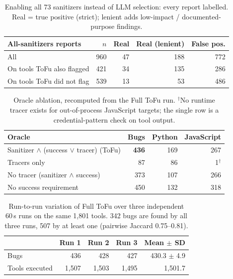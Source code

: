 \begin{table}[t]
\centering
\caption{Enabling all 73 sanitizers instead of LLM selection: every report labelled.
Real = true positive (strict); lenient adds low-impact / documented-purpose findings.}
\label{tab:ablation-allsan}
\small
\begin{tabular}{lrrrr}
\toprule
All-sanitizers reports & $n$ & Real & Real (lenient) & False pos. \\
\midrule
All                            & 960 & 47 & 188 & 772 \\
On tools ToFu also flagged     & 421 & 34 & 135 & 286 \\
On tools ToFu did not flag     & 539 & 13 &  53 & 486 \\
\bottomrule
\end{tabular}
\end{table}

\begin{table}[t]
\centering
\caption{Oracle ablation, recomputed from the Full ToFu run. $^\dagger$No runtime tracer exists for
out-of-process JavaScript targets; the single row is a credential-pattern check on tool output.}
\label{tab:ablation-oracle}
\small
\begin{tabular}{lrrr}
\toprule
Oracle & Bugs & Python & JavaScript \\
\midrule
Sanitizer $\wedge$ (success $\vee$ tracer) (ToFu) & \textbf{436} & 169 & 267 \\
Tracers only                                       &  87 &  86 & 1$^\dagger$ \\
No tracer (sanitizer $\wedge$ success)             & 373 & 107 & 266 \\
No success requirement                             & 450 & 132 & 318 \\
\bottomrule
\end{tabular}
\end{table}

\begin{table}[t]
\centering
\caption{Run-to-run variation of Full ToFu over three independent 60\,s runs on the same 1,801 tools.
342 bugs are found by all three runs, 507 by at least one (pairwise Jaccard 0.75--0.81).}
\label{tab:ablation-repeats}
\small
\begin{tabular}{lrrrr}
\toprule
 & Run 1 & Run 2 & Run 3 & Mean $\pm$ SD \\
\midrule
Bugs            &   436 &   428 &   427 & 430.3 $\pm$ 4.9 \\
Tools executed  & 1,507 & 1,503 & 1,495 & 1,501.7 \\
\bottomrule
\end{tabular}
\end{table}
